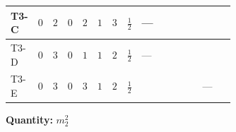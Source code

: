 \documentclass[8pt]{article}
\begin{document}
\begin{landscape}
\begin{longtable}{@{}llcccccc >{\raggedright\arraybackslash}p{0.21\linewidth} >{\raggedright\arraybackslash}p{0.21\linewidth} >{\raggedright\arraybackslash}p{0.21\linewidth}@{}}
\midrule
T3-C & $0$ & $2$ & $0$ & $2$ & $1$ & $3$ & $\frac{1}{2}$ & --- & \scriptsize\adjustbox{max width=\linewidth}{$\begin{gathered} -6 {g_1}^2 {m_2^2}\end{gathered}$} & \scriptsize\adjustbox{max width=\linewidth}{$\begin{gathered} +4 {\lambda_{12}^{(1)}} {m_1^2}\end{gathered}$} \\
\midrule
T3-D & $0$ & $3$ & $0$ & $1$ & $1$ & $2$ & $\frac{1}{2}$ & --- & \scriptsize\adjustbox{max width=\linewidth}{$\begin{gathered} -6 {g_1}^2 {m_2^2}\end{gathered}$} & \scriptsize\adjustbox{max width=\linewidth}{$\begin{gathered} +6 {\lambda_{12}^{(1)}} {m_1^2}\end{gathered}$} \\
\midrule
T3-E & $0$ & $3$ & $0$ & $3$ & $1$ & $2$ & $\frac{1}{2}$ & \scriptsize\adjustbox{max width=\linewidth}{$\begin{gathered} -12 {g_2}^2 {m_2^2}\end{gathered}$} & \scriptsize\adjustbox{max width=\linewidth}{$\begin{gathered} -6 {g_1}^2 {m_2^2}\end{gathered}$} & --- \\
\midrule
\bottomrule
\end{longtable}
\clearpage
\noindent\textbf{Quantity: }$m_2^2$\par\smallskip

\end{landscape}
\end{document}
